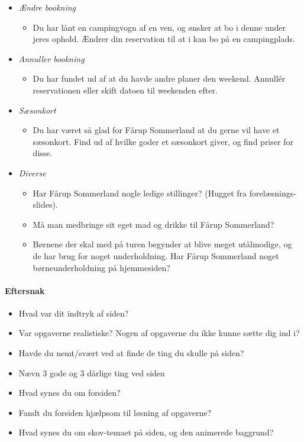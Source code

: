 \documentclass[10pt,a4paper]{article}      %
\begin{document}
\begin{itemize}
\item {\it Ændre bookning}
    \begin{itemize}
    \item Du har lånt en campingvogn af en ven, og ønsker at bo i denne under
    jeres ophold. Ændrer din reservation til at i kan bo på en campingplads.
    \end{itemize}

\item {\it Annuller bookning}
    \begin{itemize}
    \item Du har fundet ud af at du havde andre planer den weekend. Annullér
    reservationen eller skift datoen til weekenden efter.
    \end{itemize}

\item {\it Sæsonkort}
    \begin{itemize}
    \item Du har været så glad for Fårup Sommerland at du gerne vil have et
    sæsonkort. Find ud af hvilke goder et sæsonkort giver, og find priser for
    disse.
    \end{itemize}

\item {\it Diverse}
    \begin{itemize}
    \item Har Fårup Sommerland nogle ledige stillinger? (Hugget fra
    forelæsnings-slides).
    \item Må man medbringe sit eget mad og drikke til Fårup Sommerland?
    \item Børnene der skal med på turen begynder at blive meget utålmodige, og
    de har brug for noget underholdning. Har Fårup Sommerland noget
    børneunderholdning på hjemmesiden?
    \end{itemize}
\end{itemize}

\paragraph{Eftersnak}
\begin{itemize}
\item Hvad var dit indtryk af siden?
\item Var opgaverne realistiske? Nogen af opgaverne du ikke kunne sætte dig ind i?
\item Havde du nemt/svært ved at finde de ting du skulle på siden?
\item Nævn 3 gode og 3 dårlige ting ved siden
\item Hvad synes du om forsiden?
\item Fandt du forsiden hjælpsom til løsning af opgaverne?
\item Hvad synes du om skov-temaet på siden, og den animerede baggrund?
\end{itemize}
\end{document}
